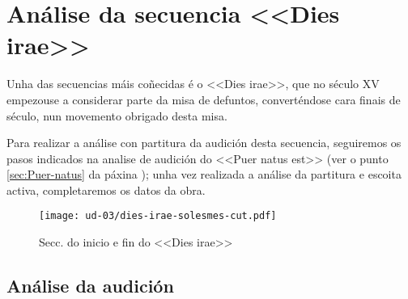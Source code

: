 %
%
\section{Análise da secuencia <<Dies irae>>} \label{sec:Dies-irae}
%
Unha das secuencias máis coñecidas é o <<Dies irae>>, que no século XV empezouse a considerar parte da misa de defuntos, converténdose cara finais de século, nun movemento obrigado desta misa.

Para realizar a análise con partitura da audición desta secuencia, seguiremos os pasos indicados na analise de audición do <<Puer natus est>>  (ver o punto \ref{sec:Puer-natus} da páxina \pageref{sec:Puer-natus}); unha vez realizada a análise da partitura e escoita activa, completaremos os datos da obra.
\par
\vspace*{0.15cm}
%
%
\begin{figure}[h]
    \centering
    \texttt{[image: ud-03/dies-irae-solesmes-cut.pdf]}
    \caption{Secc. do inicio e fin do <<Dies irae>>}
    \label{fig:dies-irae}
\end{figure}
%
%

%
\subsection*{Análise da audición}

